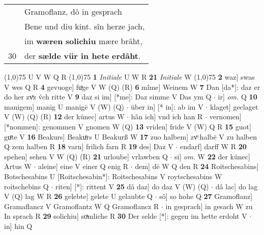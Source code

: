 \documentclass[8pt,a4paper,notitlepage]{article}
\begin{document}
\begin{table}[ht]
\begin{minipage}[t]{0.5\linewidth}
\begin{tabular}{rl}
 & Gramoflanz, dô in gesprach\\ 
 & Bene und diu kint. sîn herze jach,\\ 
 & im \textbf{wæren} \textbf{solichiu} mære brâht,\\ 
30 & der \textbf{sælde} \textbf{vür in hete} \textbf{erdâht}.\\ 
\end{tabular}
\scriptsize
\line(1,0){75} \newline
U V W Q R \newline
\line(1,0){75} \newline
\textbf{1} \textit{Initiale} U W R  \textbf{21} \textit{Initiale} W  \newline
\line(1,0){75} \newline
\textbf{2} waz] swas V wes Q R \textbf{4} gevuoge] fuͦge V W (Q) (R) \textbf{6} mîme] Weinem W \textbf{7} Dan [da*]: daz er do her zvͦz v́ch ritte V \textbf{9} daz si im] [*me]: Daz simme V Das ym Q  $\cdot$ ir] \textit{om.} Q \textbf{10} manigem] manig U manigē V (W) (Q)  $\cdot$ über in] [* in]: ab im V  $\cdot$ klaget] geclaget V (W) (Q) (R) \textbf{12} der künec] artus W  $\cdot$ hân ich] vnd ich han R  $\cdot$ vernomen] [*nommen]: genommen V gnomen W (Q) \textbf{13} vriden] fride V (W) Q R \textbf{15} guot] guͦte V \textbf{16} Beakurs] Beakuͦrs U Beakurß W \textbf{17} zuo halbem] zvͦ halbē V zu halben Q zem halben R \textbf{18} varn] frilich farn R \textbf{19} des] Daz V  $\cdot$ endarf] darff W R \textbf{20} spehen] sehen V W (Q) (R) \textbf{21} urloube] vrlawben Q  $\cdot$ si] \textit{om.} W \textbf{22} der künec] Artus W  $\cdot$ aleine] eine V einer Q enig R  $\cdot$ dem] dē W Q den R \textbf{24} Roitschesabins] Botschesabins U [Roitschesabin*]: Roitschesabins V roytschesabins W roitschebins Q  $\cdot$ riten] [*]: rittent V \textbf{25} dâ daz] do daz V (W) (Q)  $\cdot$ dâ lac] do lag V (Q) lag W R \textbf{26} gelebte] gelete U gelaubte Q  $\cdot$ sô] so hohe Q \textbf{27} Gramoflanz] Gramaflancz V Gramoflantz W Q Gramoflancz R  $\cdot$ in gesprach] in gesach W zu In sprach R \textbf{29} solichiu] soͯmliche R \textbf{30} Der selde [*]: gegen im hette erdoht V  $\cdot$ in] hin Q \newline
\end{minipage}
\end{table}
\end{document}
